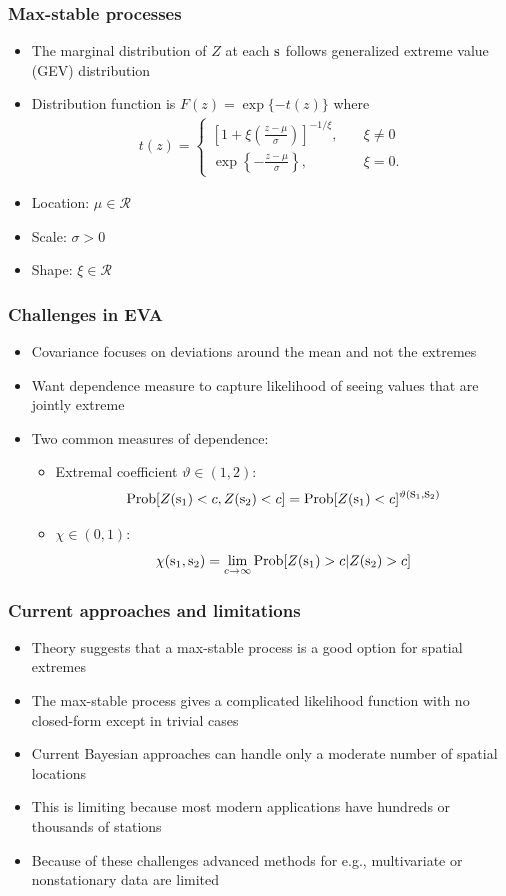 \documentclass{beamer}
\renewcommand{\bs}{ \mbox{\boldmath s}}
\newcommand{\bit}{\begin{itemize}}
\newcommand{\eit}{\end{itemize}}
\begin{document}
\begin{frame}\frametitle{Max-stable processes}
  \bit\setlength\itemsep{\fill}
  \item The marginal distribution of $Z$ at each $\bs$ follows generalized extreme value (GEV) distribution
  \item Distribution function is $F(z) = \exp\{-t(z)\}$ where
  \begin{align*}
      t(z) = \left\{ \begin{array}{ll}
        \left[1 + \xi \displaystyle \left(\frac{z - \mu}{\sigma}\right)\right]^{-1 / \xi}, \quad &\xi \neq 0 \\ [1em]
        \exp\left\{- \displaystyle \frac{z - \mu}{\sigma}\right\}, &\xi = 0.
    \end{array}\right.
  \end{align*}
    \item Location: $\mu \in \mathcal{R}$
    \item Scale: $\sigma > 0$
    \item Shape: $\xi \in \mathcal{R}$
  \eit
\end{frame}

\begin{frame}\frametitle{Challenges in EVA}
  \bit\setlength\itemsep{\fill}
  \item Covariance focuses on deviations around the mean and not the extremes
  \item Want dependence measure to capture likelihood of seeing values that are jointly extreme
  \item Two common measures of dependence: \vspace{0.5em}
  \begin{itemize}
    \item Extremal coefficient $\vartheta \in (1, 2)$: $$\mbox{Prob}[Z(\bs_1)<c, Z(\bs_2)<c] = \mbox{Prob}[Z(\bs_1)<c]^{\vartheta(\bs_1,\bs_2)}$$
    \item $\chi \in (0, 1)$: $$\chi(\bs_1,\bs_2) = \lim_{c\rightarrow \infty}\mbox{Prob}[Z(\bs_1)>c|Z(\bs_2)>c]$$
  \end{itemize}
  \eit
\end{frame}

\begin{frame}\frametitle{Current approaches and limitations}
  \bit\setlength\itemsep{\fill}
   \item Theory suggests that a max-stable process is a good option for spatial extremes
   \item The max-stable process gives a complicated likelihood function with no closed-form except in trivial cases
   \item Current Bayesian approaches can handle only a moderate number of spatial locations
   \item This is limiting because most modern applications have hundreds or thousands of stations
   \item Because of these challenges advanced methods for e.g., multivariate or nonstationary data are limited
\eit
\end{frame}
\end{document}
